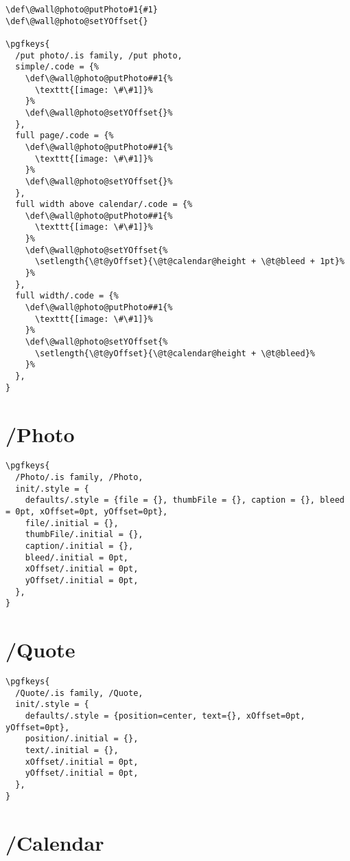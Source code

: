 \documentclass[11pt,oneside]{memoir-article}
\begin{document}
\begin{verbatim}
\def\@wall@photo@putPhoto#1{#1}
\def\@wall@photo@setYOffset{}

\pgfkeys{
  /put photo/.is family, /put photo,
  simple/.code = {%
    \def\@wall@photo@putPhoto##1{%
      \texttt{[image: \#\#1]}%
    }%
    \def\@wall@photo@setYOffset{}%
  },
  full page/.code = {%
    \def\@wall@photo@putPhoto##1{%
      \texttt{[image: \#\#1]}%
    }%
    \def\@wall@photo@setYOffset{}%
  },
  full width above calendar/.code = {%
    \def\@wall@photo@putPhoto##1{%
      \texttt{[image: \#\#1]}%
    }%
    \def\@wall@photo@setYOffset{%
      \setlength{\@t@yOffset}{\@t@calendar@height + \@t@bleed + 1pt}%
    }%
  },
  full width/.code = {%
    \def\@wall@photo@putPhoto##1{%
      \texttt{[image: \#\#1]}%
    }%
    \def\@wall@photo@setYOffset{%
      \setlength{\@t@yOffset}{\@t@calendar@height + \@t@bleed}%
    }%
  },
}
\end{verbatim}

\section{/Photo}
\label{sec-7-2}

\begin{verbatim}
\pgfkeys{
  /Photo/.is family, /Photo,
  init/.style = {
    defaults/.style = {file = {}, thumbFile = {}, caption = {}, bleed = 0pt, xOffset=0pt, yOffset=0pt},
    file/.initial = {},
    thumbFile/.initial = {},
    caption/.initial = {},
    bleed/.initial = 0pt,
    xOffset/.initial = 0pt,
    yOffset/.initial = 0pt,
  },
}
\end{verbatim}

\section{/Quote}
\label{sec-7-3}

\begin{verbatim}
\pgfkeys{
  /Quote/.is family, /Quote,
  init/.style = {
    defaults/.style = {position=center, text={}, xOffset=0pt, yOffset=0pt},
    position/.initial = {},
    text/.initial = {},
    xOffset/.initial = 0pt,
    yOffset/.initial = 0pt,
  },
}
\end{verbatim}

\section{/Calendar}
\label{sec-7-4}
\end{document}

